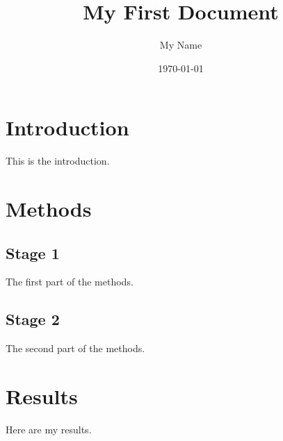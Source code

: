 \documentclass[a4paper,12pt]{article}
\begin{document}
\title{My First Document}
\author{My Name}
\date{\today}
\maketitle

\section{Introduction}
This is the introduction.

\section{Methods}

\subsection{Stage 1}
The first part of the methods.

\subsection{Stage 2}
The second part of the methods.

\section{Results}
Here are my results.
\end{document}
